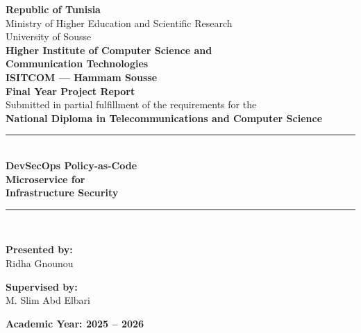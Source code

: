 
\begin{titlepage}
\begin{center}

\vspace{1cm}

{\large \textbf{Republic of Tunisia}}\\[0.2cm]
{\large Ministry of Higher Education and Scientific Research}\\[0.2cm]
{\large University of Sousse}\\[0.5cm]

{\Large \textbf{Higher Institute of Computer Science and\\Communication Technologies}}\\[0.1cm]
{\large \textbf{ISITCOM --- Hammam Sousse}}\\[1.5cm]

{\LARGE \textbf{Final Year Project Report}}\\[0.3cm]
{\large Submitted in partial fulfillment of the requirements for the}\\[0.1cm]
{\large \textbf{National Diploma in Telecommunications and Computer Science}}\\[1.5cm]

\rule{\textwidth}{1.5pt}\\[0.5cm]
{\Huge \textbf{DevSecOps Policy-as-Code\\Microservice for\\Infrastructure Security}}\\[0.5cm]
\rule{\textwidth}{1.5pt}\\[2cm]

\begin{minipage}{0.45\textwidth}
\begin{flushleft}
{\large \textbf{Presented by:}}\\[0.3cm]
{\Large Ridha Gnounou}
\end{flushleft}
\end{minipage}
\hfill
\begin{minipage}{0.45\textwidth}
\begin{flushright}
{\large \textbf{Supervised by:}}\\[0.3cm]
{\Large M. Slim Abd Elbari}
\end{flushright}
\end{minipage}

\vfill

{\large \textbf{Academic Year: 2025 -- 2026}}

\end{center}
\end{titlepage}
